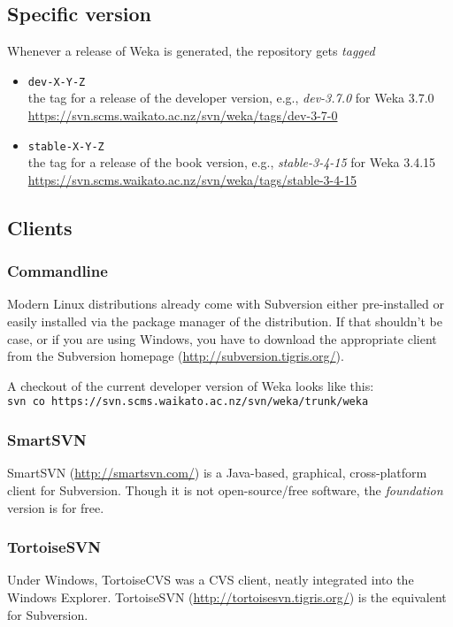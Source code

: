\subsection{Specific version}
Whenever a release of Weka is generated, the repository gets \textit{tagged}

\begin{itemize}
\item \verb=dev-X-Y-Z=\\the tag for a release of the developer version, e.g., \textit{dev-3.7.0} for Weka 3.7.0\\
\url{https://svn.scms.waikato.ac.nz/svn/weka/tags/dev-3-7-0}{}
\item \verb=stable-X-Y-Z=\\ the tag for a release of the book version, e.g., \textit{stable-3-4-15} for Weka 3.4.15\\
\url{https://svn.scms.waikato.ac.nz/svn/weka/tags/stable-3-4-15}{}
\end{itemize}

\subsection{Clients}
\subsubsection*{Commandline}
Modern Linux distributions already come with Subversion either
pre-installed or easily installed via the package manager of the
distribution. If that shouldn't be case, or if you are using Windows,
you have to download the appropriate client from the Subversion
homepage (\url{http://subversion.tigris.org/}{}).

\noindent A checkout of the current developer version of Weka looks like this:\\

\verb=svn co https://svn.scms.waikato.ac.nz/svn/weka/trunk/weka=

\subsubsection*{SmartSVN}
SmartSVN (\url{http://smartsvn.com/}{}) is a Java-based, graphical,
cross-platform client for Subversion. Though it is not
open-source/free software, the \textit{foundation} version is for free.

\subsubsection*{TortoiseSVN}
Under Windows, TortoiseCVS was a CVS client, neatly integrated into
the Windows Explorer. TortoiseSVN
(\url{http://tortoisesvn.tigris.org/}{}) is the equivalent for
Subversion.


